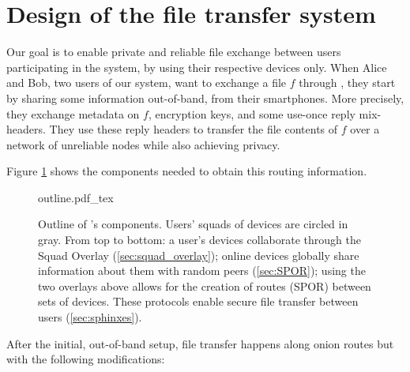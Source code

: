 
\section{Design of the \name file transfer system}%
\label{design}


Our goal is to enable private and reliable file exchange between users 
participating in the system, by using their respective devices only.
When Alice and Bob, two users of our system, want to exchange a file \(f\) 
through \name, they start by sharing some information out-of-band, \eg from 
their smartphones.
More precisely, they exchange metadata on \(f\), encryption keys, and
some use-once reply mix-headers.
They use these reply headers to transfer the file contents of \(f\) over a 
network of unreliable nodes while also achieving privacy.

Figure \cref{fig:outline} shows the components needed to obtain this
routing information.  

\begin{figure}[t]
  \centering
  \def\svgwidth{0.8\columnwidth}
  {outline.pdf_tex}
  \caption{\label{fig:outline}%
    Outline of \name's components. Users' squads of devices are circled in gray. 
    From top to bottom: a user's devices collaborate through the Squad Overlay 
    (\cref{sec:squad_overlay}); online devices globally share information about 
    them with random peers (\cref{sec:SPOR}); using the two 
    overlays above allows for the creation of routes (\ac{SPOR}) between sets of devices. 
    These protocols enable secure file transfer between users 
    (\cref{sec:sphinxes}).}
\end{figure}

After the initial, out-of-band setup, file transfer happens along
onion routes but with the following \name modifications:

